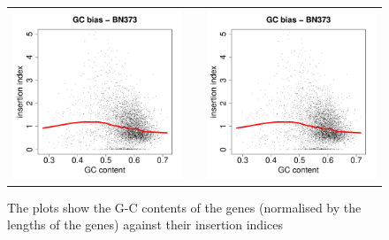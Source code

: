 \documentclass[12pt,letterpaper]{article}
\begin{document}
\begin{figure}
\begin{tabular}{c c c}
\includegraphics[page=37, scale=0.25]{biases.pdf}&&
\includegraphics[page=40, scale=0.25]{biases.pdf}\\
\end{tabular}
\caption{The plots show the G-C contents of the genes (normalised by the lengths of the genes) against their insertion indices}
\label{fig:GC-bias}
\end{figure}
\end{document}
